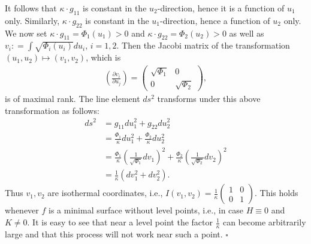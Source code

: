 \documentclass[a4paper]{article}
\numberwithin{equation}{section}
\begin{document}
It follows that $\kappa \cdot g_{11}$ is constant in the $u_2$-direction, hence it is a function of $u_1$ only. Similarly, $\kappa \cdot g_{22}$ is constant in the $u_1$-direction, hence a function of $u_2$ only. We now set $\kappa  \cdot {g_{11}} = {\Phi _1}\left( {{u_1}} \right) > 0$ and $\kappa  \cdot {g_{22}} = {\Phi _2}\left( {{u_2}} \right) > 0$ as well as ${v_i}: = \int {\sqrt {{\Phi _i}\left( {{u_i}} \right)} d{u_i}} $, $i=1,2$. Then the Jacobi matrix of the transformation $\left(u_1,u_2\right)\mapsto \left(v_1,v_2\right)$, which is
\begin{align}
\left( {\frac{{\partial {v_i}}}{{\partial {u_j}}}} \right) = \left( {\begin{array}{*{20}{c}}
{\sqrt {{\Phi _1}} }&0\\
0&{\sqrt {{\Phi _2}} }
\end{array}} \right),
\end{align}
is of maximal rank. The line element $ds^2$ transforms under this above transformation as follows:
\begin{align}
d{s^2} &= {g_{11}}du_1^2 + {g_{22}}du_2^2\\
& = \frac{{{\Phi _1}}}{\kappa }du_1^2 + \frac{{{\Phi _2}}}{\kappa }du_2^2\\
& = \frac{{{\Phi _1}}}{\kappa }{\left( {\frac{1}{{\sqrt {{\Phi _1}} }}d{v_1}} \right)^2} + \frac{{{\Phi _2}}}{\kappa }{\left( {\frac{1}{{\sqrt {{\Phi _2}} }}d{v_2}} \right)^2}\\
& = \frac{1}{\kappa }\left( {dv_1^2 + dv_2^2} \right).
\end{align}
Thus $v_1,v_2$ are isothermal coordinates, i.e., $I\left( {{v_1},{v_2}} \right) = \frac{1}{\kappa }\left( {\begin{array}{*{20}{c}}
1&0\\
0&1
\end{array}} \right)$. This holds whenever $f$ is a minimal surface without level points, i.e., in case $H\equiv 0$ and $K\ne 0$. It is easy to see that near a level point the factor $\frac{1}{\kappa}$ can become arbitrarily large and that this process will not work near such a point. \hfill $\square$\\
\end{document}
